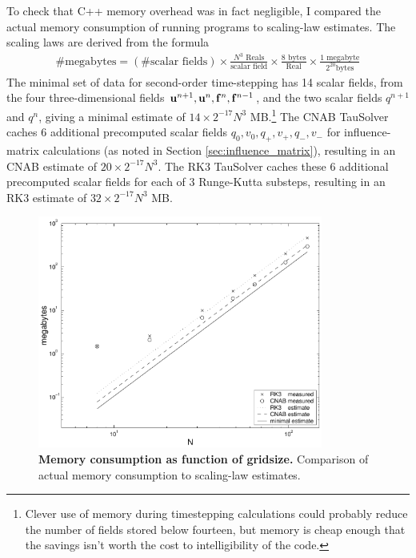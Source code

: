 \documentclass{article}[12pt]
\begin{document}
To check that C++ memory overhead was in fact negligible, I compared
the actual memory consumption of running programs to scaling-law
estimates. The scaling laws are derived from the formula
\begin{align}
\text{\# megabytes} = (\text{\# scalar fields}) \times \frac{N^3 \text{ Reals}}{\text{scalar field}} \times
\frac{8 \text{ bytes}}{\text{Real}} \times \frac{1 \text{ megabyte}}{2^{20} \text{bytes}}
\end{align}
The minimal set of data for second-order time-stepping has 14 scalar
fields, from the four three-dimensional fields ${\bf u}^{n+1}, {\bf u}^n, {\bf f}^n,
{\bf f}^{n-1}$, and the two scalar fields $q^{n+1}$ and $q^n$, giving a
minimal estimate of $14 \times 2^{-17} N^3$ MB.\footnote{Clever use of
memory during timestepping calculations could probably reduce the number of
fields stored below fourteen, but memory is cheap enough that the savings
isn't worth the cost to intelligibility of the code.} The CNAB TauSolver
caches 6 additional precomputed scalar fields $q_0, v_0, q_+, v_+,
q_-, v_-$ for influence-matrix calculations (as noted in Section
\ref{sec:influence_matrix}), resulting in an CNAB estimate of $20
\times 2^{-17} N^3$. The RK3 TauSolver caches these 6 additional
precomputed scalar fields for each of 3 Runge-Kutta substeps,
resulting in an RK3 estimate of $32 \times 2^{-17} N^3$ MB.

\begin{figure}
\centering
\includegraphics[height=3.0in]{memory}
\caption{{\bf Memory consumption as function of gridsize.} Comparison of
actual memory consumption to scaling-law estimates.}
\label{fig:memory}
\end{figure}
\end{document}
